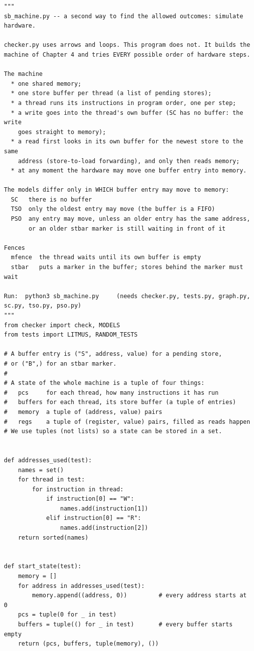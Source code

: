 \begin{lstlisting}[style=vspython]
"""
sb_machine.py -- a second way to find the allowed outcomes: simulate hardware.

checker.py uses arrows and loops. This program does not. It builds the
machine of Chapter 4 and tries EVERY possible order of hardware steps.

The machine
  * one shared memory;
  * one store buffer per thread (a list of pending stores);
  * a thread runs its instructions in program order, one per step;
  * a write goes into the thread's own buffer (SC has no buffer: the write
    goes straight to memory);
  * a read first looks in its own buffer for the newest store to the same
    address (store-to-load forwarding), and only then reads memory;
  * at any moment the hardware may move one buffer entry into memory.

The models differ only in WHICH buffer entry may move to memory:
  SC   there is no buffer
  TSO  only the oldest entry may move (the buffer is a FIFO)
  PSO  any entry may move, unless an older entry has the same address,
       or an older stbar marker is still waiting in front of it

Fences
  mfence  the thread waits until its own buffer is empty
  stbar   puts a marker in the buffer; stores behind the marker must wait

Run:  python3 sb_machine.py     (needs checker.py, tests.py, graph.py, sc.py, tso.py, pso.py)
"""
from checker import check, MODELS
from tests import LITMUS, RANDOM_TESTS

# A buffer entry is ("S", address, value) for a pending store,
# or ("B",) for an stbar marker.
#
# A state of the whole machine is a tuple of four things:
#   pcs     for each thread, how many instructions it has run
#   buffers for each thread, its store buffer (a tuple of entries)
#   memory  a tuple of (address, value) pairs
#   regs    a tuple of (register, value) pairs, filled as reads happen
# We use tuples (not lists) so a state can be stored in a set.


def addresses_used(test):
    names = set()
    for thread in test:
        for instruction in thread:
            if instruction[0] == "W":
                names.add(instruction[1])
            elif instruction[0] == "R":
                names.add(instruction[2])
    return sorted(names)


def start_state(test):
    memory = []
    for address in addresses_used(test):
        memory.append((address, 0))         # every address starts at 0
    pcs = tuple(0 for _ in test)
    buffers = tuple(() for _ in test)       # every buffer starts empty
    return (pcs, buffers, tuple(memory), ())



\end{lstlisting}
